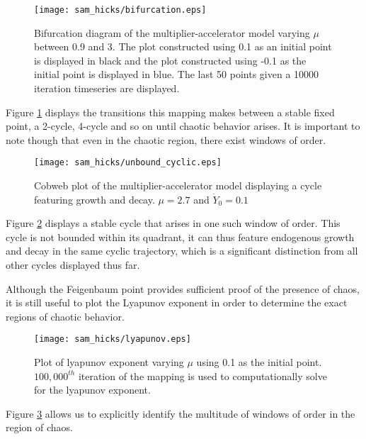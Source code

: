 \begin{figure}
    \centering
    \texttt{[image: sam\_hicks/bifurcation.eps]}
    \caption{Bifurcation diagram of the multiplier-accelerator model varying $\mu$ between 0.9 and 3. The plot constructed using 0.1 as an initial point is displayed in black and the plot constructed using -0.1 as the initial point is displayed in blue. The last 50 points given a 10000 iteration timeseries are displayed.}
    \label{mult_bifurcation}
\end{figure}
Figure \ref{mult_bifurcation} displays the transitions this mapping makes between a stable fixed point, a 2-cycle, 4-cycle and so on until chaotic behavior arises. It is important to note though that even in the chaotic region, there exist windows of order. 
\begin{figure}
    \centering
    \texttt{[image: sam\_hicks/unbound\_cyclic.eps]}
    \caption{Cobweb plot of the multiplier-accelerator model displaying a cycle featuring growth and decay. $\mu=2.7$ and $\dot Y_0=0.1$}
    \label{mult_unbound-cycle}
\end{figure}
Figure \ref{mult_unbound-cycle} displays a stable cycle that arises in one such window of order. This cycle is not bounded within its quadrant, it can thus feature endogenous growth and decay in the same cyclic trajectory, which is a significant distinction from all other cycles displayed thus far. 

Although the Feigenbaum point provides sufficient proof of the presence of chaos, it is still useful to plot the Lyapunov exponent in order to determine the exact regions of chaotic behavior.
\begin{figure}
    \centering
    \texttt{[image: sam\_hicks/lyapunov.eps]}
    \caption{Plot of lyapunov exponent varying $\mu$ using 0.1 as the initial point. $100,000^{th}$ iteration of the mapping is used to computationally solve for the lyapunov exponent. }
    \label{mult_lyapunov}
\end{figure}
Figure \ref{mult_lyapunov} allows us to explicitly identify the multitude of windows of order in the region of chaos. 